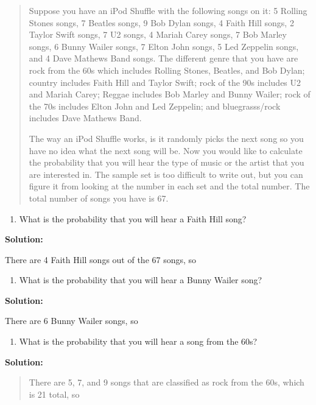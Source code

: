 \documentclass[]{book}
\providecommand{\tightlist}{%
  \setlength{\itemsep}{0pt}\setlength{\parskip}{0pt}}
\begin{document}
\begin{quote}
Suppose you have an iPod Shuffle with the following songs on it: 5
Rolling Stones songs, 7 Beatles songs, 9 Bob Dylan songs, 4 Faith Hill
songs, 2 Taylor Swift songs, 7 U2 songs, 4 Mariah Carey songs, 7 Bob
Marley songs, 6 Bunny Wailer songs, 7 Elton John songs, 5 Led Zeppelin
songs, and 4 Dave Mathews Band songs. The different genre that you
have are rock from the 60s which includes Rolling Stones, Beatles, and
Bob Dylan; country includes Faith Hill and Taylor Swift; rock of the
90s includes U2 and Mariah Carey; Reggae includes Bob Marley and Bunny
Wailer; rock of the 70s includes Elton John and Led Zeppelin; and
bluegrasss/rock includes Dave Mathews Band.

The way an iPod Shuffle works, is it randomly picks the next song so
you have no idea what the next song will be. Now you would like to
calculate the probability that you will hear the type of music or the
artist that you are interested in. The sample set is too difficult to
write out, but you can figure it from looking at the number in each
set and the total number. The total number of songs you have is 67.
\end{quote}

\begin{enumerate}
\def\labelenumi{\alph{enumi}.}
\tightlist
\item
  What is the probability that you will hear a Faith Hill song?
\end{enumerate}

\textbf{Solution:}

There are 4 Faith Hill songs out of the 67 songs, so

\begin{enumerate}
\def\labelenumi{\alph{enumi}.}
\setcounter{enumi}{1}
\tightlist
\item
  What is the probability that you will hear a Bunny Wailer song?
\end{enumerate}

\textbf{Solution:}

There are 6 Bunny Wailer songs, so

\begin{enumerate}
\def\labelenumi{\alph{enumi}.}
\setcounter{enumi}{2}
\tightlist
\item
  What is the probability that you will hear a song from the 60s?
\end{enumerate}

\textbf{Solution:}

\begin{quote}
There are 5, 7, and 9 songs that are classified as rock from the 60s,
which is 21 total, so
\end{quote}
\end{document}
